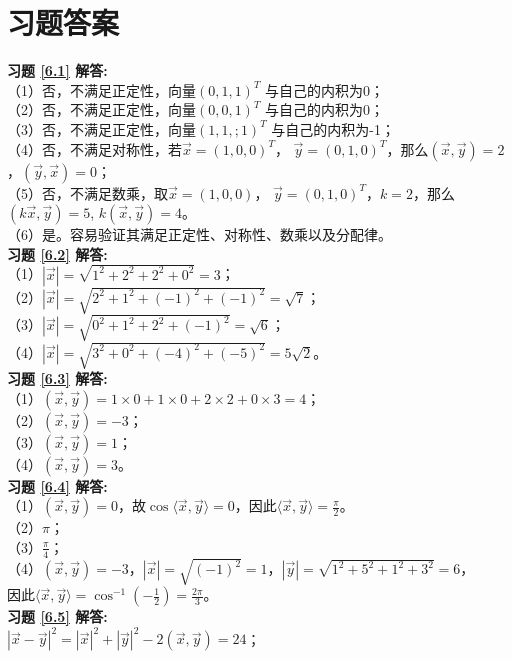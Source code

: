 \documentclass[a4paper]{book}
\begin{document}
\section{习题答案}
\textbf{习题 \ref{6.1} 解答:}\\
（1）否，不满足正定性，向量$(0,1,1)^T$ 与自己的内积为0；\\
（2）否，不满足正定性，向量$(0,0,1)^T$ 与自己的内积为0；\\
（3）否，不满足正定性，向量$(1,1,;1)^T$ 与自己的内积为-1；\\
（4）否，不满足对称性，若$\vec{x}=(1,0,0)^T$， $\vec{y}=(0,1,0)^T$，那么$(\vec{x},\vec{y})=2$，$(\vec{y},\vec{x})=0$；\\
（5）否，不满足数乘，取$\vec{x}=(1,0,0)$， $\vec{y}=(0,1,0)^T$，$k=2$，那么$(k\vec{x},\vec{y})=5$,
          $k(\vec{x},\vec{y})=4$。\\
（6）是。容易验证其满足正定性、对称性、数乘以及分配律。\\
\textbf{习题 \ref{6.2} 解答:}\\
（1）$|\vec{x}|=\sqrt{1^2+2^2+2^2+0^2}=3$；\\
（2）$|\vec{x}|=\sqrt{2^2+1^2+(-1)^2+(-1)^2}=\sqrt{7}$；\\
（3）$|\vec{x}|=\sqrt{0^2+1^2+2^2+(-1)^2}=\sqrt{6}$；\\
（4）$|\vec{x}|=\sqrt{3^2+0^2+(-4)^2+(-5)^2}=5\sqrt{2}$。\\
\textbf{习题 \ref{6.3} 解答:}\\
（1）$(\vec{x},\vec{y})=1\times0+1\times0+2\times2+0\times3=4$；\\
（2）$(\vec{x},\vec{y})=-3$；\\
（3）$(\vec{x},\vec{y})=1$；\\
（4）$(\vec{x},\vec{y})=3$。\\
\textbf{习题 \ref{6.4} 解答:}\\
（1）$(\vec{x},\vec{y})=0$，故$\cos\langle\vec{x},\vec{y}\rangle=0$，因此$\langle\vec{x},\vec{y}\rangle=\frac{\pi}{2}$。\\
（2）$\pi$；\\
（3）$\frac{\pi}{4}$；\\
（4）$(\vec{x},\vec{y})=-3$，$|\vec{x}|=\sqrt{(-1)^2}=1$，$|\vec{y}|=\sqrt{1^2+5^2+1^2+3^2}=6$，\\
     因此$\langle\vec{x},\vec{y}\rangle=\cos^{-1}(-\frac{1}{2})=\frac{2\pi}{3}$。\\
\textbf{习题 \ref{6.5} 解答:}\\
$|\vec{x}-\vec{y}|^2=|\vec{x}|^2+|\vec{y}|^2-2(\vec{x},\vec{y})=24$；\\
\end{document}
